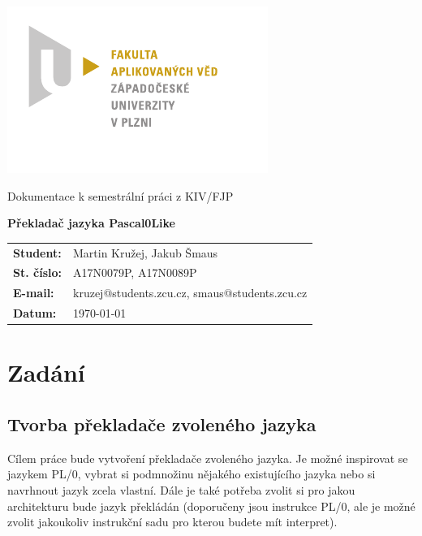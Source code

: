 \documentclass[
12pt,
a4paper,
pdftex,
czech,
titlepage
]{report}
\begin{document}
\begin{titlepage}
	\vspace*{-2cm}
	{\centering\includegraphics[scale=1.5]{FAV_logo.pdf}\par}
	\centering
	\vspace*{2cm}
	{\Large Dokumentace k semestrální práci z KIV/FJP\par}
	\vspace{1.0cm}
	{\Huge\bfseries Překladač jazyka Pascal0Like\par}
	\vspace{7cm}

	\begin{flushleft} 
	\begin{table}[ht]
	\label{stats}
	\begin{tabular}{ll}
	\textbf{Student:}  & Martin Kružej, Jakub Šmaus   \\
	\textbf{St. číslo:}   & A17N0079P, A17N0089P    \\
	\textbf{E-mail:}  & kruzej@students.zcu.cz, smaus@students.zcu.cz  \\
	\textbf{Datum:}    & \today            \\ 
	\end{tabular}
	\end{table}
	\end{flushleft}
	
	\vfill


\end{titlepage}

\tableofcontents
\thispagestyle{empty}
\clearpage

\chapter{Zadání}
\setcounter{page}{1}

\section{Tvorba překladače zvoleného jazyka}
Cílem práce bude vytvoření překladače zvoleného jazyka. Je možné inspirovat se jazykem PL/0, vybrat si podmnožinu nějakého existujícího jazyka nebo si navrhnout jazyk zcela vlastní. Dále je také potřeba zvolit si pro jakou architekturu bude jazyk překládán (doporučeny jsou instrukce PL/0, ale je možné zvolit jakoukoliv instrukční sadu pro kterou budete mít interpret). 
\end{document}
